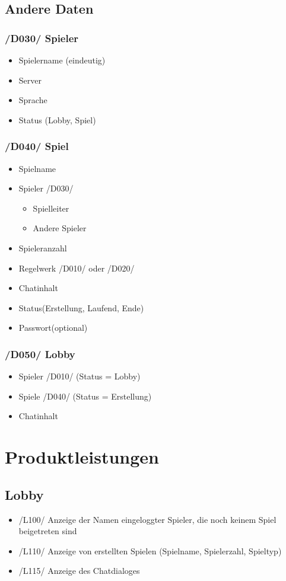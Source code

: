 \documentclass{article}
\begin{document}
\subsection{Andere Daten}
\subsubsection{/D030/ Spieler}
\begin{itemize}
	\item Spielername (eindeutig)
	\item \gls{Server}
	\item Sprache
	\item Status (\gls{Lobby}, Spiel)
\end{itemize}	

\subsubsection{/D040/ Spiel}
\begin{itemize}
	\item Spielname
	\item Spieler /D030/
	\begin{itemize}
		\item \gls{Spielleiter}
		\item Andere Spieler
	\end{itemize}
	\item Spieleranzahl
	\item \gls{Regelwerk} /D010/ oder /D020/
	\item Chatinhalt
	\item Status(Erstellung, Laufend, Ende)
	\item Passwort(optional)
\end{itemize}

\subsubsection{/D050/ \gls{Lobby}}
\begin{itemize}
	\item Spieler /D010/ (Status = \gls{Lobby})
	\item Spiele /D040/ (Status = Erstellung)
	\item Chatinhalt
\end{itemize}

\section{Produktleistungen}
\subsection{\gls{Lobby}}
\begin{itemize}
	\item /L100/ Anzeige der Namen eingeloggter Spieler, die noch keinem Spiel beigetreten sind
	\item /L110/ Anzeige von erstellten Spielen (Spielname, Spielerzahl, Spieltyp)	
	\item /L115/ Anzeige des Chatdialoges		
\end{itemize}
\end{document}
